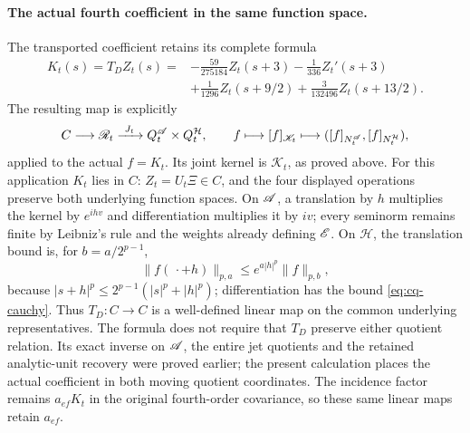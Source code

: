 \paragraph{The actual fourth coefficient in the same function space.}
The transported coefficient retains its complete formula
\begin{align*}
 K_t(s)=T_DZ_t(s)
 ={}&-\frac{59}{275184}Z_t(s+3)-\frac1{336}Z_t'(s+3)\\
 &+\frac1{1296}Z_t(s+9/2)+\frac3{132496}Z_t(s+13/2).
\end{align*}
The resulting map is explicitly
\[
 C\longrightarrow\mathscr R_t\xrightarrow{\ J_t\ }
 Q_t^{\mathscr A}\times Q_t^{\mathcal H},\qquad
 f\longmapsto[f]_{\mathscr K_t}
 \longmapsto([f]_{N_t^{\mathscr A}},[f]_{N_t^{\mathcal H}}),
\]
applied to the actual $f=K_t$. Its joint kernel is
$\mathscr K_t$, as proved above. For this application $K_t$
lies in $C$: $Z_t=U_t\Xi\in C$, and the four displayed operations
preserve both underlying function spaces. On $\mathscr A$, a translation
by $h$ multiplies the kernel by $e^{ihv}$ and differentiation
multiplies it by $iv$; every seminorm remains finite by Leibniz's
rule and the weights already defining $\mathscr E$. On $\mathcal H$, the
translation bound is, for $b=a/2^{p-1}$,
\[
 \|f(\,\cdot+h)\|_{p,a}\leq e^{a|h|^p}\|f\|_{p,b},
\]
because $|s+h|^p\leq2^{p-1}(|s|^p+|h|^p)$; differentiation has
the bound \eqref{eq:cq-cauchy}. Thus $T_D:C\to C$ is a well-defined
linear map on the common underlying representatives. The formula
does not require that $T_D$ preserve either quotient relation.
Its exact inverse on $\mathscr A$, the entire jet quotients and the retained
analytic-unit recovery were proved earlier; the present calculation
places the actual coefficient in both moving quotient coordinates.
The incidence factor remains $a_{ef}K_t$ in the original
fourth-order covariance, so these same linear maps retain $a_{ef}$.
